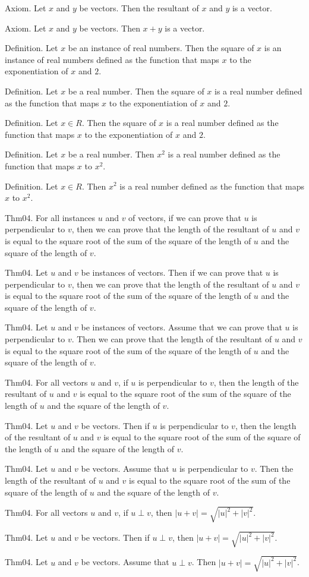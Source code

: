 \documentclass{article}
\begin{document}
Axiom. Let $x$ and $y$ be vectors. Then the resultant of $x$ and $y$ is a vector.

Axiom. Let $x$ and $y$ be vectors. Then $x + y$ is a vector.

Definition. Let $x$ be an instance of real numbers. Then the square of $x$ is an instance of real numbers defined as the function that maps $x$ to the exponentiation of $x$ and $2$.

Definition. Let $x$ be a real number. Then the square of $x$ is a real number defined as the function that maps $x$ to the exponentiation of $x$ and $2$.

Definition. Let $x \in R$. Then the square of $x$ is a real number defined as the function that maps $x$ to the exponentiation of $x$ and $2$.

Definition. Let $x$ be a real number. Then $x ^{ 2}$ is a real number defined as the function that maps $x$ to ${x }^{ 2}$.

Definition. Let $x \in R$. Then $x ^{ 2}$ is a real number defined as the function that maps $x$ to ${x }^{ 2}$.

Thm04. For all instances $u$ and $v$ of vectors, if we can prove that $u$ is perpendicular to $v$, then we can prove that the length of the resultant of $u$ and $v$ is equal to the square root of the sum of the square of the length of $u$ and the square of the length of $v$.

Thm04. Let $u$ and $v$ be instances of vectors. Then if we can prove that $u$ is perpendicular to $v$, then we can prove that the length of the resultant of $u$ and $v$ is equal to the square root of the sum of the square of the length of $u$ and the square of the length of $v$.

Thm04. Let $u$ and $v$ be instances of vectors. Assume that we can prove that $u$ is perpendicular to $v$. Then we can prove that the length of the resultant of $u$ and $v$ is equal to the square root of the sum of the square of the length of $u$ and the square of the length of $v$.

Thm04. For all vectors $u$ and $v$, if $u$ is perpendicular to $v$, then the length of the resultant of $u$ and $v$ is equal to the square root of the sum of the square of the length of $u$ and the square of the length of $v$.

Thm04. Let $u$ and $v$ be vectors. Then if $u$ is perpendicular to $v$, then the length of the resultant of $u$ and $v$ is equal to the square root of the sum of the square of the length of $u$ and the square of the length of $v$.

Thm04. Let $u$ and $v$ be vectors. Assume that $u$ is perpendicular to $v$. Then the length of the resultant of $u$ and $v$ is equal to the square root of the sum of the square of the length of $u$ and the square of the length of $v$.

Thm04. For all vectors $u$ and $v$, if $u \perp v$, then $| u + v | = \sqrt{ | u | ^{ 2}+ | v | ^{ 2}}$.

Thm04. Let $u$ and $v$ be vectors. Then if $u \perp v$, then $| u + v | = \sqrt{ | u | ^{ 2}+ | v | ^{ 2}}$.

Thm04. Let $u$ and $v$ be vectors. Assume that $u \perp v$. Then $| u + v | = \sqrt{ | u | ^{ 2}+ | v | ^{ 2}}$.
\end{document}
